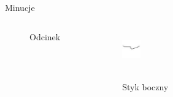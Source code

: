 \documentclass{beamer}
\begin{document}
\begin{frame}{Minucje}
\begin{columns}
\begin{figure}[t]
                \caption*{Odcinek}
            \end{figure}
            \begin{figure}[t]
			    \centering
                \includegraphics[width=0.4\textwidth]{fingerprints/minucje/styk_boczny.jpg}\\~\
                \caption*{Styk boczny}
            \end{figure}
    \end{columns}
\end{frame}
\end{document}
